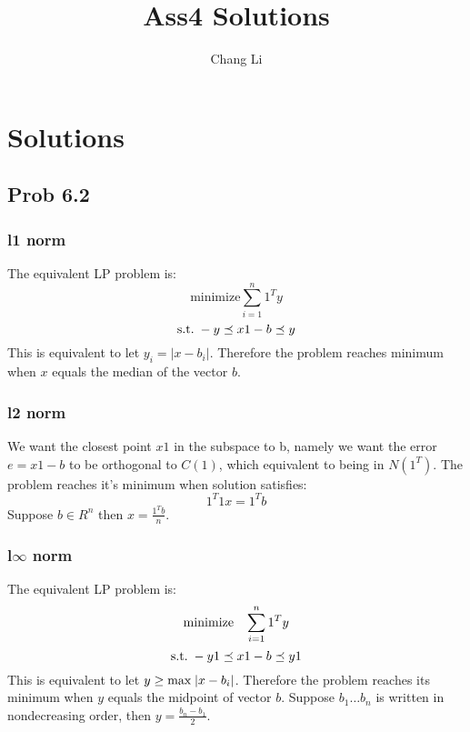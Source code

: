 \documentclass[10pt,a4paper]{article}
\begin{document}
\title{Ass4 Solutions}
\author{Chang Li}
\maketitle

\section{Solutions}

\subsection{Prob 6.2}

\subsubsection{l1 norm}

The equivalent LP problem is:
$$
\text{minimize} \sum_{i=1}^n 1^Ty
$$
$$
\text{s.t.\;}  -y \preceq x1-b \preceq y
$$
This is equivalent to let $y_i = |x - b_i|$. Therefore the problem
reaches minimum when $x$ equals the median of the vector $b$.

\subsubsection{l2 norm}
We want the closest point $x1$ in the subspace to b, namely
we want the error $e = x1 - b$ to be orthogonal to $C(1)$,
which equivalent to being in $N(1^T)$. The problem reaches
it's minimum when solution satisfies:
$$
1^T1x=1^Tb
$$
Suppose $b\in R^n$ then $x=\frac{1^Tb}{n}$.


\subsubsection{l$\infty$ norm}

The equivalent LP problem is:
$$
\text{minimize \;\;}\sum_{i=1}^n 1^Ty
$$
$$
\text{s.t.\;}  -y1 \preceq x1-b \preceq y1
$$
This is equivalent to let $y \geq \text{max\;}|x - b_i|$.
Therefore the problem reaches its minimum when $y$ equals
the midpoint of vector $b$. Suppose $b_1 \dots b_n$ is
written in nondecreasing order, then $y=\frac{b_n-b_1}{2}$.
\end{document}
